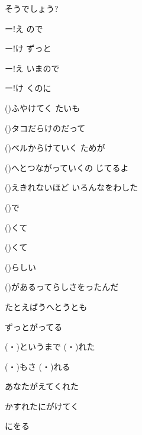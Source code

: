 \documentclass[14pt]{ltjsarticle}
\begin{document}
{  そうでしょう?
  \jisho{}

\item
  ー!え ので
  \jisho{}

  ー!け ずっと
  \jisho{}

  ー!え いまので
  \jisho{}

  ー!け くのに
  \jisho{}

\item
  ()ふやけてく たいも
  \jisho{}

  ()タコだらけのだって
  \jisho{}

  ()ベルからけていく ためが
  \jisho{}

  ()へとつながっていくの じてるよ
  \jisho{}

\item
  ()えきれないほど いろんなをわした
  \jisho{}

  ()で
  \jisho{}

  ()くて
  \jisho{}

  ()くて
  \jisho{}

  ()らしい
  \jisho{}

  ()があるってらしさをったんだ
  \jisho{}

\item
  たとえばうへとうとも
  \jisho{}

  ずっとがってる
  \jisho{}

  (・)というまで (・)れた
  \jisho{}

  (・)もさ (・)れる
  \jisho{}

  あなたがえてくれた
  \jisho{}

  かすれたにがけてく
  \jisho{}

  にをる
  \jisho{}

}
\end{document}
